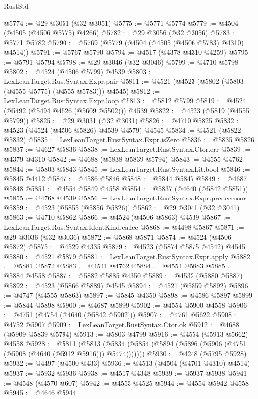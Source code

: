 \begin{lexlean}{RustStd}
\begin{coremodule}
@5774 := @29 @3051 (@32 @3051)
@5775 := @5771 @5774
@5779 := @4504 (@4505 (@4506 @5775) @4266)
@5782 := @29 @3056 (@32 @3056)
@5783 := @5771 @5782
@5790 := @5769 (@5779 (@4504 (@4505 (@4506 @5783) @4310) @4514))
@5791 := @5767 @5790
@5794 := @4517 (@4378 @4310 @4259)
@5795 := @5791 @5794
@5798 := @29 @3046 (@32 @3046)
@5799 := @4710 @5798
@5802 := @4524 (@4506 @5799) @4539
@5803 := LexLeanTarget.RustSyntax.Expr.pair
@5811 := @4521 (@4523 (@5802 (@5803 (@4555 @5775) (@4555 @5783))) @4545)
@5812 := LexLeanTarget.RustSyntax.Expr.loop
@5813 := @5812 @5799
@5819 := @4524 (@5492 (@5494 @4526 (@5609 @5502))) @4539
@5822 := @4523 (@5819 (@4555 @5799))
@5825 := @29 @3031 (@32 @3031)
@5826 := @4710 @5825
@5832 := @4523 (@4524 (@4506 @5826) @4539 @4579) @4545
@5834 := @4521 (@5822 @5832)
@5835 := LexLeanTarget.RustSyntax.Expr.isZero
@5836 := @5835 @5826
@5837 := @4627 @5836
@5838 := LexLeanTarget.RustSyntax.Ctor.err
@5839 := @4379 @4310
@5842 := @4688 (@5838 @5839 @5794)
@5843 := @4555 @4762
@5844 := @5803 @5843
@5845 := LexLeanTarget.RustSyntax.Lit.bool
@5846 := @5845 @4412
@5847 := @4586 @5846
@5848 := @5844 @5847
@5849 := @4687 @5848
@5851 := @4554 @5849 @4558
@5854 := @5837 (@4640 (@5842 @5851))
@5855 := @4768 @4539
@5856 := LexLeanTarget.RustSyntax.Expr.predecessor
@5859 := @4523 (@5855 (@5856 @5826))
@5862 := @29 @3041 (@32 @3041)
@5863 := @4710 @5862
@5866 := @4524 (@4506 @5863) @4539
@5867 := LexLeanTarget.RustSyntax.IdentKind.callee
@5868 := @4498 @5867
@5871 := @29 @3036 (@32 @3036)
@5872 := @5868 @5871
@5874 := @4524 (@4506 @5872)
@5875 := @4529 @4335
@5879 := @4523 (@5874 @5875 @4542) @4545
@5880 := @4521 @5879
@5881 := LexLeanTarget.RustSyntax.Expr.apply
@5882 := @5881 @5872
@5883 := @4541 @4762
@5884 := @4554 @5883
@5885 := @5884 @4558
@5887 := @5882 @5885 @4350
@5889 := @4532 (@5880 @5887)
@5892 := @4523 (@5866 @5889) @4545
@5894 := @4521 (@5859 @5892)
@5896 := @4747 (@4555 @5863)
@5897 := @5845 @4350
@5898 := @4586 @5897
@5899 := @5844 @5898
@5900 := @4687 @5899
@5902 := @4554 @5900 @4558
@5906 := @4751 (@4754 (@4640 (@5842 @5902)))
@5907 := @4761 @5622
@5908 := @4752 @5907
@5909 := LexLeanTarget.RustSyntax.Ctor.ok
@5912 := @4688 (@5909 @5839 @5794)
@5913 := @5803 @4799
@5916 := @4554 (@5913 @5662) @4558
@5928 := @5811
    (@5813 (@5834 (@5854 (@5894 (@5896 (@5906 (@4751 (@5908 (@4640 (@5912 @5916))) @5474)))))))
@5930 := @4248 (@5795 @5928)
@5932 := @4497 (@4500 @433)
@5936 := @4513 (@4504 (@4701 @4310) @4514)
@5937 := @5932 @5936
@5938 := @4517 @4348
@5939 := @5937 @5938
@5941 := @4548 (@4570 @607)
@5942 := @4555 @4525
@5944 := @4554 @5942 @4558
@5945 := @4646 @5944

\end{coremodule}
\end{lexlean}
